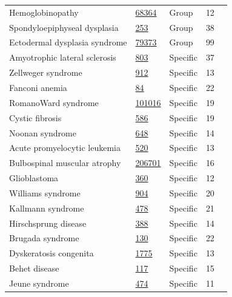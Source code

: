 \begin{table}[ht]
\begin{tabular}{l l l l c}
Hemoglobinopathy & \href{https://www.orpha.net/en/disease/detail/68364}{68364} & Group & 12 \\
Spondyloepiphyseal dysplasia & \href{https://www.orpha.net/en/disease/detail/253}{253} & Group & 38 \\
Ectodermal dysplasia syndrome & \href{https://www.orpha.net/en/disease/detail/79373}{79373} & Group & 99 \\
Amyotrophic lateral sclerosis & \href{https://www.orpha.net/en/disease/detail/803}{803} & Specific & 37 \\
Zellweger syndrome & \href{https://www.orpha.net/en/disease/detail/912}{912} & Specific & 13 \\
Fanconi anemia & \href{https://www.orpha.net/en/disease/detail/84}{84} & Specific & 22 \\
RomanoWard syndrome & \href{https://www.orpha.net/en/disease/detail/101016}{101016} & Specific & 19 \\
Cystic fibrosis & \href{https://www.orpha.net/en/disease/detail/586}{586} & Specific & 19 \\
Noonan syndrome & \href{https://www.orpha.net/en/disease/detail/648}{648} & Specific & 14 \\
Acute promyelocytic leukemia & \href{https://www.orpha.net/en/disease/detail/520}{520} & Specific & 13 \\
Bulbospinal muscular atrophy & \href{https://www.orpha.net/en/disease/detail/206701}{206701} & Specific & 16 \\
Glioblastoma & \href{https://www.orpha.net/en/disease/detail/360}{360} & Specific & 12 \\
Williams syndrome & \href{https://www.orpha.net/en/disease/detail/904}{904} & Specific & 20 \\
Kallmann syndrome  & \href{https://www.orpha.net/en/disease/detail/478}{478} & Specific & 21 \\
Hirschsprung disease & \href{https://www.orpha.net/en/disease/detail/388}{388} & Specific & 14 \\
Brugada syndrome  & \href{https://www.orpha.net/en/disease/detail/130}{130} & Specific & 22 \\
Dyskeratosis congenita & \href{https://www.orpha.net/en/disease/detail/1775}{1775} & Specific & 13 \\
Behet disease & \href{https://www.orpha.net/en/disease/detail/117}{117} & Specific & 15 \\
Jeune syndrome & \href{https://www.orpha.net/en/disease/detail/474}{474} & Specific & 11 \\

\end{tabular}
\end{table}
